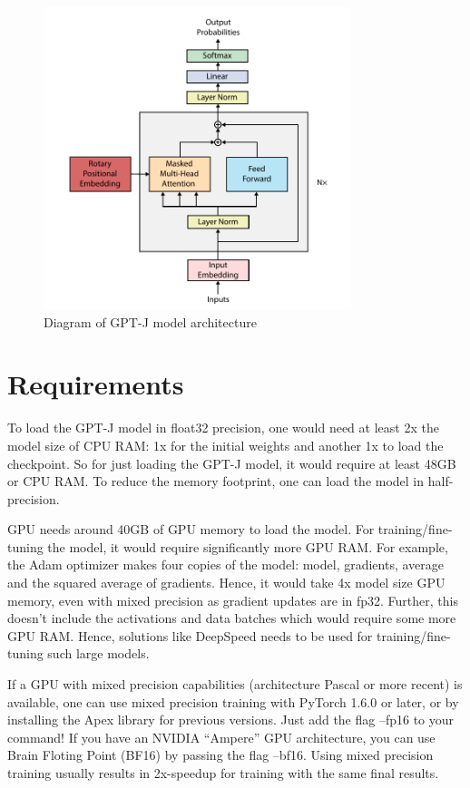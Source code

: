 \begin{figure}[htp]
    \centering
    \includegraphics[width=0.8\textwidth]{figures/gpt-j_architecture.pdf}
    \caption{Diagram of GPT-J model architecture}
    \label{fig:gpt-j-architecture}
\end{figure}

\section{Requirements}
To load the GPT-J model in float32 precision, one would need at least 2x the model size of CPU RAM: 1x for the initial weights and another 1x to load the checkpoint. So for just loading the GPT-J model, it would require at least 48GB or CPU RAM. To reduce the memory footprint, one can load the model in half-precision.

GPU needs around 40GB of GPU memory to load the model. For training/fine-tuning the model, it would require significantly more GPU RAM. For example, the Adam optimizer makes four copies of the model: model, gradients, average and the squared average of gradients. Hence, it would take 4x model size GPU memory, even with mixed precision as gradient updates are in fp32. Further, this doesn't include the activations and data batches which would require some more GPU RAM. Hence, solutions like DeepSpeed needs to be used for training/fine-tuning such large models.

If a GPU with mixed precision capabilities (architecture Pascal or more recent) is available, one can use mixed precision training with PyTorch 1.6.0 or later, or by installing the Apex library for previous versions. Just add the flag --fp16 to your command! If you have an NVIDIA “Ampere” GPU architecture, you can use Brain Floting Point (BF16) by passing the flag --bf16. Using mixed precision training usually results in 2x-speedup for training with the same final results.

